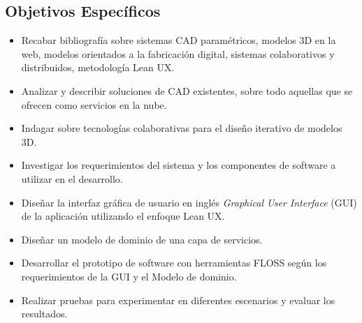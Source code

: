 \subsection {Objetivos Específicos}
\begin{itemize}
  \item Recabar bibliografía sobre sistemas CAD paramétricos, modelos 3D en la web, modelos orientados a la fabricación digital, sistemas colaborativos y distribuidos, metodología Lean UX. 
  
  \item Analizar y describir soluciones de CAD existentes, sobre todo aquellas que se ofrecen como servicios en la nube.
  
  \item Indagar sobre tecnologías colaborativas para el diseño iterativo de modelos 3D.
  
  \item Investigar los requerimientos del sistema y los componentes de software a utilizar en el desarrollo.
  
  \item Diseñar la interfaz gráfica de usuario en inglés \textit{Graphical User Interface} (GUI) de la aplicación utilizando el enfoque Lean UX.
  
  \item Diseñar un modelo de dominio de una capa de servicios.
  
  \item Desarrollar el prototipo de software con herramientas FLOSS \citep{stallman2007software}\citep{Stallman} según los requerimientos de la GUI y el Modelo de dominio.
  
  \item Realizar pruebas para experimentar en diferentes escenarios y evaluar los resultados.
\end{itemize}
